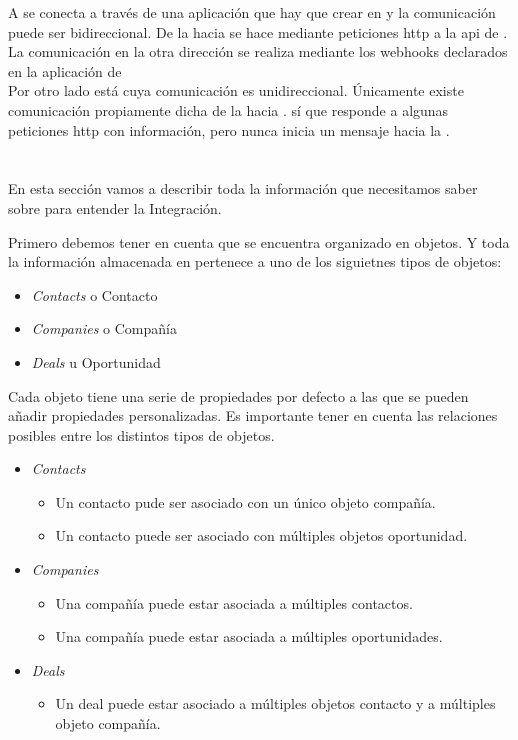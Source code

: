 A \hs{} se conecta a través de una aplicación que hay que crear en \hs{} y la comunicación  puede ser bidireccional. De la \iface{} hacia \hs{} se hace mediante peticiones \acrshort{http} a la \acrshort{api} de \hs{}. 
La comunicación en la otra dirección se realiza mediante los webhooks declarados en la aplicación de \hs{}\\

Por otro lado está \wday{} cuya comunicación es unidireccional. Únicamente existe comunicación propiamente dicha de la \iface{} hacia \wday. \wday{} sí que responde a algunas peticiones \acrshort{http} con información, pero nunca inicia un mensaje hacia la \iface.

\section{\hs{}}
En esta sección vamos a describir toda la información que necesitamos saber sobre \hs{} para entender la Integración.

Primero debemos tener en cuenta que \hs{} se encuentra organizado en objetos. Y toda la información almacenada en \hs{} pertenece a uno de los siguietnes tipos de objetos:

\begin{itemize}
	\item \textit{Contacts} o Contacto
	\item \textit{Companies} o Compañía
	\item \textit{Deals} u Oportunidad
\end{itemize}

Cada objeto tiene una serie de propiedades por defecto a las que se pueden añadir propiedades personalizadas.
Es importante tener en cuenta las relaciones posibles entre los distintos tipos de objetos.

\begin{itemize}
	\item \textit{Contacts}
	\begin{itemize}
		\item Un contacto pude ser asociado con un único objeto compañía.
		\item Un contacto puede ser asociado con múltiples objetos oportunidad.
	\end{itemize}
	\item \textit{Companies}
	\begin{itemize}
		\item Una compañía puede estar asociada a múltiples contactos.
		\item Una compañía puede estar asociada a múltiples oportunidades.
	\end{itemize}
	\item \textit{Deals}
	\begin{itemize}
		\item Un deal puede estar asociado a múltiples objetos contacto y a múltiples objeto compañía.
	\end{itemize}
\end{itemize}

